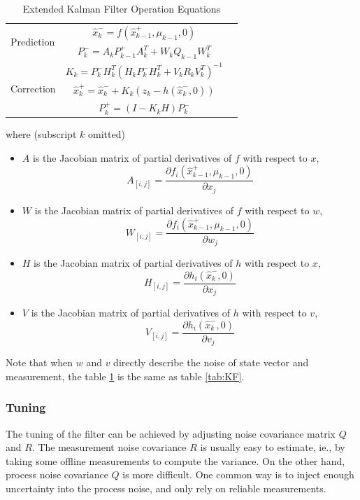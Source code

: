 \begin{table}[H]
\caption{Extended Kalman Filter Operation Equations}
\label{tab:EKF}
\centering
\begin{tabular}{|l|c r|}
\hline
\multirow{2}{*}{Prediction} 
& $\hat{x}^-_k=f(\hat{x}^+_{k-1},\mu_{k-1},0)$ & \stepcounter{equation}\thetag{\theequation}\\
& $P^-_k = A_kP^+_{k-1}A_k^T+W_kQ_{k-1}W_k^T$ & \stepcounter{equation}\thetag{\theequation}\\
\hline
\multirow{3}{*}{Correction}
& $K_k=P^-_kH_k^T(H_kP^-_kH_k^T+V_kR_kV_k^T)^{-1}$  & \stepcounter{equation}\thetag{\theequation}\\
& $\hat{x}^+_k = \hat{x}^-_k+K_k(z_k-h(\hat{x}^-_k,0))$ & \stepcounter{equation}\thetag{\theequation}\\
& $P^+_k = (I-K_kH)P^-_k$ & \stepcounter{equation}\thetag{\theequation}\\
\hline
\end{tabular}
\end{table}
\FloatBarrier

\noindent where (subscript $k$ omitted)
\begin{itemize}
  \item $A$ is the Jacobian matrix of partial derivatives of $f$ with
  respect to $x$, $$A_{[i,j]}= \frac{\partial f_i(\hat{x}_{k-1}^+, \mu_{k-1},
    0)}{\partial x_j}$$
  \item $W$ is the Jacobian matrix of partial derivatives of $f$ with
  respect to $w$, $$W_{[i,j]}= \frac{\partial f_i(\hat{x}_{k-1}^+, \mu_{k-1},
    0)}{\partial w_j}$$
  \item $H$ is the Jacobian matrix of partial derivatives of $h$ with
  respect to $x$, $$H_{[i,j]}= \frac{\partial h_i(\hat{x}_k^-, 0)}{\partial x_j}$$
  \item $V$ is the Jacobian matrix of partial derivatives of $h$ with
  respect to $v$, $$V_{[i,j]}= \frac{\partial h_i(\hat{x}_k^-,0)}{\partial v_j}$$
\end{itemize}

\noindent Note that when $w$ and $v$ directly describe the noise of
state vector and measurement, the table \ref{tab:EKF} is the same as
table \ref{tab:KF}. 

\subsubsection{Tuning}

The tuning of the filter can be achieved by adjusting noise covariance
matrix $Q$ and $R$. The measurement noise covariance $R$ is usually
easy to estimate, ie., by taking some offline measurements to compute
the variance. On the other hand, process noise covariance $Q$ is more
difficult. One common way is to inject enough uncertainty into the
process noise, and only rely on reliable measurements. 
 
